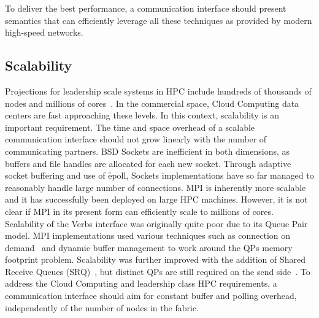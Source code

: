 To deliver the best performance, a communication interface should present
semantics that can efficiently leverage all these techniques as provided by 
modern high-speed networks.

\subsection{Scalability}
Projections for leadership scale systems in HPC include hundreds of thousands of nodes 
and millions of cores~\cite{dongarra:exascale-talk-2010}. In the commercial 
space, Cloud Computing data centers are fast approaching these levels. 
In this context, scalability is an important requirement. The time and space 
overhead of a scalable communication interface should not grow linearly with 
the number of communicating partners. BSD Sockets are inefficient in both 
dimensions, as buffers and file handles are allocated for each new socket. 
Through adaptive socket buffering and use of \f{epoll}, Sockets implementations 
have so far managed to reasonably handle large number of connections. 
MPI is inherently more scalable and it has successfully been deployed on large 
HPC machines. However, it is not clear if MPI in its present form can 
efficiently scale to millions of cores. 
Scalability of the Verbs interface was originally quite poor due to its Queue 
Pair model. MPI implementations used various techniques such as connection on 
demand~\cite{Shipman_infinibandscalability} and dynamic buffer management 
to work around the QPs memory footprint problem. Scalability was further
improved with the addition of Shared Receive Queues 
(SRQ)~\cite{shipman07:_inves_infin}, but distinct QPs are still  
required on the send side~\cite{Shipman:2008:XIS:1431669.1431683}. To
address the Cloud Computing and leadership class HPC requirements, a
communication interface should aim for constant buffer and polling
overhead, independently of the number of nodes in the fabric. 

